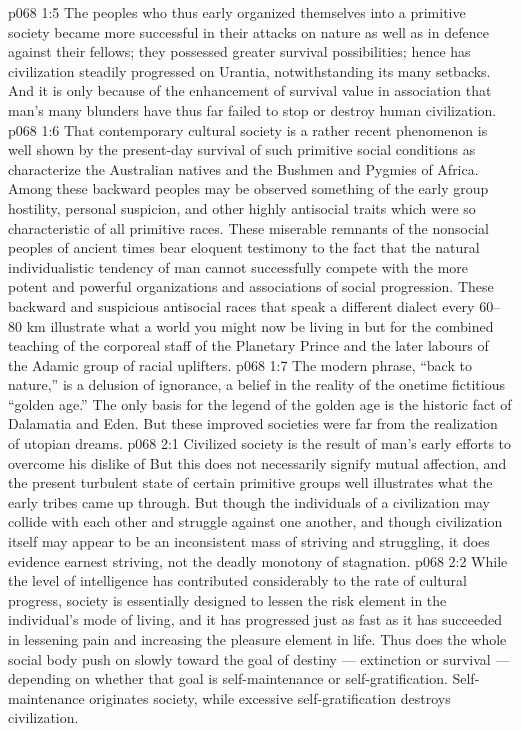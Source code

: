 \vs p068 1:5 The peoples who thus early organized themselves into a primitive society became more successful in their attacks on nature as well as in defence against their fellows; they possessed greater survival possibilities; hence has civilization steadily progressed on Urantia, notwithstanding its many setbacks. And it is only because of the enhancement of survival value in association that man’s many blunders have thus far failed to stop or destroy human civilization.
\vs p068 1:6 \pc That contemporary cultural society is a rather recent phenomenon is well shown by the present\hyp{}day survival of such primitive social conditions as characterize the Australian natives and the Bushmen and Pygmies of Africa. Among these backward peoples may be observed something of the early group hostility, personal suspicion, and other highly antisocial traits which were so characteristic of all primitive races. These miserable remnants of the nonsocial peoples of ancient times bear eloquent testimony to the fact that the natural individualistic tendency of man cannot successfully compete with the more potent and powerful organizations and associations of social progression. These backward and suspicious antisocial races that speak a different dialect every 60--80 km illustrate what a world you might now be living in but for the combined teaching of the corporeal staff of the Planetary Prince and the later labours of the Adamic group of racial uplifters.
\vs p068 1:7 The modern phrase, “back to nature,” is a delusion of ignorance, a belief in the reality of the onetime fictitious “golden age.” The only basis for the legend of the golden age is the historic fact of Dalamatia and Eden. But these improved societies were far from the realization of utopian dreams.
\vs p068 2:1 Civilized society is the result of man’s early efforts to overcome his dislike of  But this does not necessarily signify mutual affection, and the present turbulent state of certain primitive groups well illustrates what the early tribes came up through. But though the individuals of a civilization may collide with each other and struggle against one another, and though civilization itself may appear to be an inconsistent mass of striving and struggling, it does evidence earnest striving, not the deadly monotony of stagnation.
\vs p068 2:2 While the level of intelligence has contributed considerably to the rate of cultural progress, society is essentially designed to lessen the risk element in the individual’s mode of living, and it has progressed just as fast as it has succeeded in lessening pain and increasing the pleasure element in life. Thus does the whole social body push on slowly toward the goal of destiny --- extinction or survival --- depending on whether that goal is self\hyp{}maintenance or self\hyp{}gratification. Self\hyp{}maintenance originates society, while excessive self\hyp{}gratification destroys civilization.
